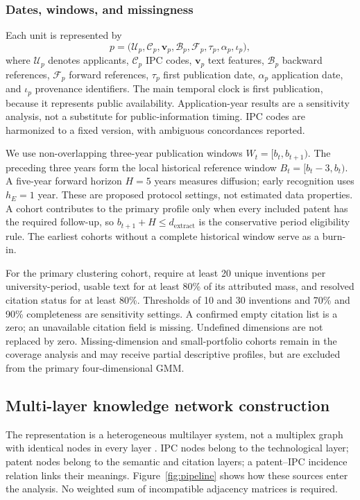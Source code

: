 \subsubsection{Dates, windows, and missingness}
Each unit is represented by
\begin{equation}
 p=\bigl(\mathcal{U}_p,\mathcal{C}_p,\mathbf{v}_p,
          \mathcal{B}_p,\mathcal{F}_p,\tau_p,\alpha_p,\iota_p\bigr),
\end{equation}
where $\mathcal{U}_p$ denotes applicants, $\mathcal{C}_p$ IPC codes,
$\mathbf{v}_p$ text features, $\mathcal{B}_p$ backward references,
$\mathcal{F}_p$ forward references, $\tau_p$ first publication date,
$\alpha_p$ application date, and $\iota_p$ provenance identifiers.
The main temporal clock is first publication, because it represents public
availability. Application-year results are a sensitivity analysis, not a
substitute for public-information timing. IPC codes are harmonized to a fixed
version, with ambiguous concordances reported.

We use non-overlapping three-year publication windows $W_t=[b_t,b_{t+1})$.
The preceding three years form the local historical reference window
$B_t=[b_t-3,b_t)$. A five-year forward horizon $H=5$ years measures diffusion;
early recognition uses $h_E=1$ year. These are proposed protocol settings,
not estimated data properties. A cohort contributes to the primary profile only
when every included patent has the required follow-up, so
$b_{t+1}+H\leq d_{\mathrm{extract}}$ is the conservative period eligibility rule.
The earliest cohorts without a complete historical window serve as a burn-in.

For the primary clustering cohort, require at least 20 unique inventions per
university-period, usable text for at least 80\% of its attributed mass, and
resolved citation status for at least 80\%. Thresholds of 10 and 30 inventions
and 70\% and 90\% completeness are sensitivity settings. A confirmed empty
citation list is a zero; an unavailable citation field is missing. Undefined
dimensions are not replaced by zero. Missing-dimension and small-portfolio
cohorts remain in the coverage analysis and may receive partial descriptive
profiles, but are excluded from the primary four-dimensional GMM.

\subsection{Multi-layer knowledge network construction}\label{sec:networks}
The representation is a heterogeneous multilayer system, not a multiplex graph
with identical nodes in every layer \citep{kivela2014,boccaletti2014}. IPC nodes
belong to the technological layer; patent nodes belong to the semantic and citation
layers; a patent--IPC incidence relation links their meanings. Figure~\ref{fig:pipeline}
shows how these sources enter the analysis. No weighted sum of incompatible
adjacency matrices is required.

